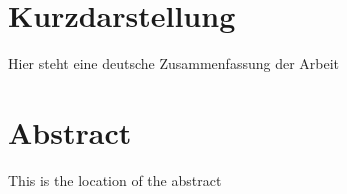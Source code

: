 \thispagestyle{empty}
\section*{Kurzdarstellung}
\label{sec:kurzdarstellung}
Hier steht eine deutsche Zusammenfassung der Arbeit


\section*{Abstract}
\label{sec:abstract}
This is the location of the abstract
